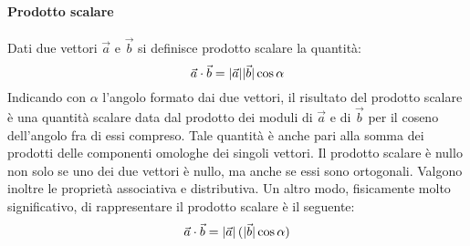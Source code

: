 \documentclass[10pt,a4paper]{book}
\DeclarePairedDelimiter{\abs}{\lvert}{\rvert} %
\begin{document}
\paragraph{Prodotto scalare} Dati due vettori $\vec{a}$ e $\vec{b}$ si definisce prodotto scalare la quantità:
\[
	\vec{a}\cdot \vec{b}= \abs{\vec{a}}\abs{\vec{b}}\cos\alpha
\]
Indicando con $\alpha$ l'angolo formato dai due vettori, il risultato del prodotto scalare è una quantità scalare data dal prodotto dei moduli di $\vec{a}$ e di $\vec{b}$ per il coseno dell'angolo fra di essi compreso. Tale quantità è anche pari alla somma dei prodotti delle componenti omologhe dei singoli vettori. Il prodotto scalare è nullo non solo se uno dei due vettori è nullo, ma anche se essi sono ortogonali. Valgono inoltre le proprietà associativa e distributiva. Un altro modo, fisicamente molto significativo, di rappresentare il prodotto scalare è il seguente:
\[
	\vec{a}\cdot \vec{b}= \abs{\vec{a}}\,(\abs{\vec{b}}\cos\alpha)
\]
\end{document}
